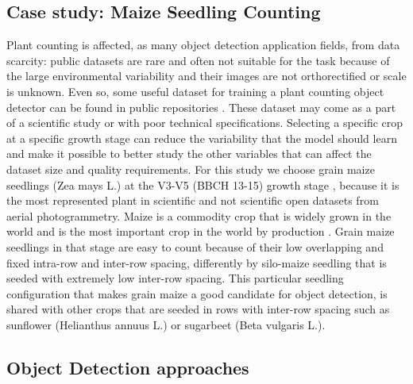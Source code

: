 \documentclass{article}
\begin{document}
\subsection*{Case study: Maize Seedling Counting}

Plant counting is affected, as many object detection application fields, from data scarcity: public datasets
are rare and often not suitable for the task because of the large environmental
variability and their images are not orthorectified or scale is unknown. 
Even so, some useful dataset for training a plant counting object detector can be found in public repositories \cite{heiderSurveyDatasetsComputer2025}.
These dataset may come as a part of a scientific study or with poor technical specifications. 
Selecting a specific crop at a specific growth stage can reduce the variability that 
the model should learn and make it possible to better study the other variables
that can affect the dataset size and quality requirements. 
For this study we choose grain maize seedlings
(Zea mays L.) at the V3-V5 (BBCH 13-15) growth stage \cite{meierBBCHSystemCoding2009},
because it is the most represented plant in scientific \cite{davidPlantDetectionCounting2021,liuIntegrateNetDeepLearning2022}
and not scientific \cite{Maize_seedingDatasetOverview,MaizeseedlingdetectionDatasetOverview}
open datasets from aerial photogrammetry. 
Maize is a commodity crop that is widely grown in the world and is the most important
crop in the world by production \cite{fao2024}. Grain maize seedlings in that stage are easy to
count because of their low overlapping and fixed intra-row and inter-row spacing, 
differently by silo-maize seedling that is seeded with extremely low inter-row spacing.
This particular seedling configuration that makes grain maize a good candidate for object detection,
is shared with other crops that are seeded in rows with inter-row spacing such as sunflower (Helianthus annuus L.)
or sugarbeet (Beta vulgaris L.).

\subsection*{Object Detection approaches}
\end{document}
